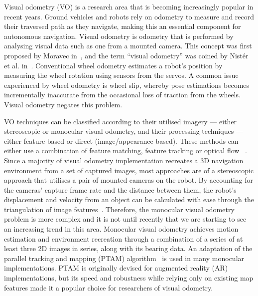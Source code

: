 Visual odometry (VO) is a research area that is becoming increasingly popular in recent years. Ground vehicles and robots rely on odometry to measure and record their traversed path as they navigate, making this an essential component for autonomous navigation. Visual odometry is odometry that is performed by analysing visual data such as one from a mounted camera. This concept was first proposed by Moravec in~\cite{hans_peter_moravec_obstacle_1980}, and the term ``visual odometry'' was coined by Nistér et al. in~\cite{nister_visual_2006}. Conventional wheel odometry estimates a robot's position by measuring the wheel rotation using sensors from the servos. A common issue experienced by wheel odometry is wheel slip, whereby pose estimations becomes incrementally inaccurate from the occasional loss of traction from the wheels. Visual odometry negates this problem.

VO techniques can be classified according to their utilised imagery --- either stereoscopic or monocular visual odometry, and their processing techniques --- either feature-based or direct (image/appearance-based). These methods can either use a combination of feature matching, feature tracking or optical flow ~\cite{scaramuzza_visual_2011, yousif_overview_2015}. Since a majority of visual odometry implementation recreates a 3D navigation environment from a set of captured images, most approaches are of a stereoscopic approach that utilises a pair of mounted cameras on the robot. By accounting for the cameras' capture frame rate and the distance between them, the robot's displacement and velocity from an object can be calculated with ease through the triangulation of image features~\cite{hartley_triangulation_1997}. Therefore, the monocular visual odometry problem is more complex and it is not until recently that we are starting to see an increasing trend in this area. Monocular visual odometry achieves motion estimation and environment recreation through a combination of a series of at least three 2D images in series, along with its bearing data. An adaptation of the parallel tracking and mapping (PTAM) algorithm~\cite{georg_klein_parallel_2007} is used in many monocular implementations. PTAM is originally devised for augmented reality (AR) implementations, but its speed and robustness while relying only on existing map features made it a popular choice for researchers of visual odometry. 


